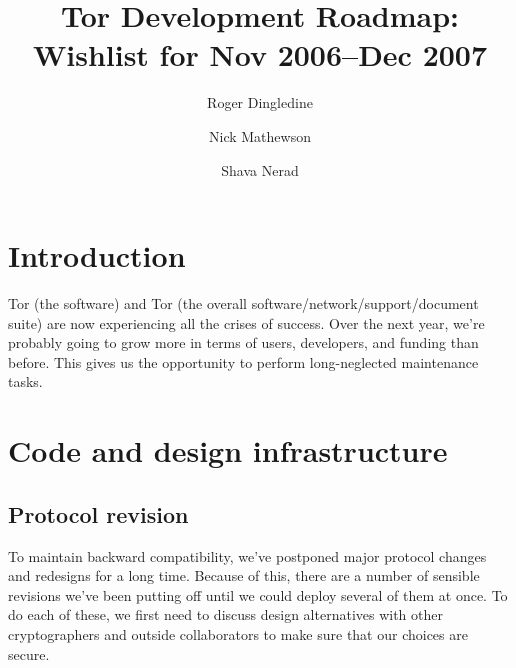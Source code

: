 \documentclass{article}
\begin{document}
\title{Tor Development Roadmap: Wishlist for Nov 2006--Dec 2007}
\author{Roger Dingledine \and Nick Mathewson \and Shava Nerad}

\maketitle
\pagestyle{plain}



\section{Introduction}

Tor (the software) and Tor (the overall software/network/support/document
suite) are now experiencing all the crises of success.  Over the next year,
we're probably going to grow more in terms of users, developers, and funding
than before.  This gives us the opportunity to perform long-neglected
maintenance tasks.

\section{Code and design infrastructure}

\subsection{Protocol revision}
To maintain backward compatibility, we've postponed major protocol
changes and redesigns for a long time.  Because of this, there are a number
of sensible revisions we've been putting off until we could deploy several of
them at once.  To do each of these, we first need to discuss design
alternatives with other cryptographers and outside collaborators to
make sure that our choices are secure.
\end{document}
